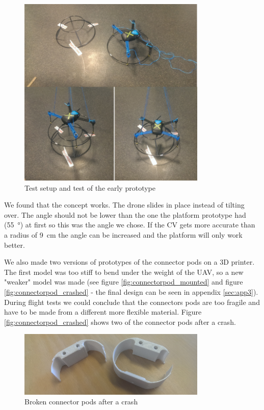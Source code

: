 \begin{figure}
	\centering
	\includegraphics[width=0.8\textwidth]{imgs/prototype1_test}
	\caption{Test setup and test of the early prototype}
\end{figure}

We found that the concept works. The drone slides in place instead of tilting over. The angle should not be lower than the one the platform prototype had (\SI{55}{\degree}) at first so this was the angle we chose. If the CV gets more accurate than a radius of \SI{9}{\centi\meter} the angle can be increased and the platform will only work better.

We also made two versions of prototypes of the connector pods on a 3D printer. The first model was too stiff to bend under the weight of the UAV, so a new "weaker" model was made (see figure \vref{fig:connectorpod_mounted} and figure \vref{fig:connectorpod_crashed} - the final design can be seen in appendix \ref{sec:app3}). During flight tests we could conclude that the connectors pods are too fragile and have to be made from a different more flexible material. Figure \vref{fig:connectorpod_crashed} shows two of the connector pods after a crash.

\begin{figure}
	\centering
	\includegraphics[width=0.8\textwidth]{imgs/connectorpod_crashed}
	\caption{Broken connector pods after a crash}
	\label{fig:connectorpod_crashed}
\end{figure}

